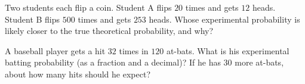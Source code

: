 \begin{challengeBox}
\prob Two students each flip a coin. Student A flips $20$ times and gets $12$ heads. Student B flips $500$ times and gets $253$ heads. Whose experimental probability is likely closer to the true theoretical probability, and why? \answerBlank[5cm]

\prob A baseball player gets a hit $32$ times in $120$ at-bats. What is his experimental batting probability (as a fraction and a decimal)? If he has $30$ more at-bats, about how many hits should he expect? \answerBlank[4cm]
\end{challengeBox}

